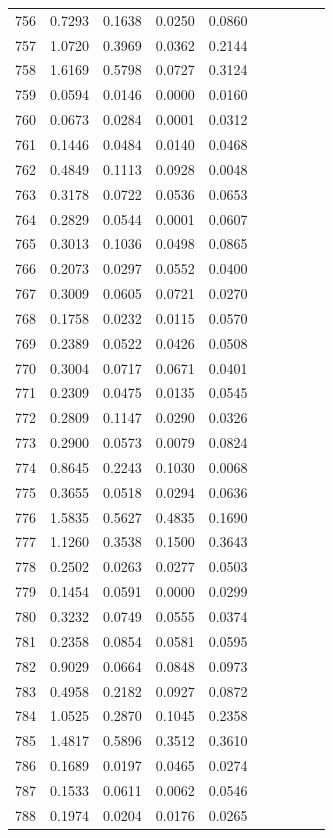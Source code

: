 \begin{table}
\begin{tabular}{cccccccccc}
756& 0.7293& 0.1638& 0.0250& 0.0860\\ 
757& 1.0720& 0.3969& 0.0362& 0.2144\\ 
758& 1.6169& 0.5798& 0.0727& 0.3124\\ 
759& 0.0594& 0.0146& 0.0000& 0.0160\\ 
760& 0.0673& 0.0284& 0.0001& 0.0312\\ 
761& 0.1446& 0.0484& 0.0140& 0.0468\\ 
762& 0.4849& 0.1113& 0.0928& 0.0048\\ 
763& 0.3178& 0.0722& 0.0536& 0.0653\\ 
764& 0.2829& 0.0544& 0.0001& 0.0607\\ 
765& 0.3013& 0.1036& 0.0498& 0.0865\\ 
766& 0.2073& 0.0297& 0.0552& 0.0400\\ 
767& 0.3009& 0.0605& 0.0721& 0.0270\\ 
768& 0.1758& 0.0232& 0.0115& 0.0570\\ 
769& 0.2389& 0.0522& 0.0426& 0.0508\\ 
770& 0.3004& 0.0717& 0.0671& 0.0401\\ 
771& 0.2309& 0.0475& 0.0135& 0.0545\\ 
772& 0.2809& 0.1147& 0.0290& 0.0326\\ 
773& 0.2900& 0.0573& 0.0079& 0.0824\\ 
774& 0.8645& 0.2243& 0.1030& 0.0068\\ 
775& 0.3655& 0.0518& 0.0294& 0.0636\\ 
776& 1.5835& 0.5627& 0.4835& 0.1690\\ 
777& 1.1260& 0.3538& 0.1500& 0.3643\\ 
778& 0.2502& 0.0263& 0.0277& 0.0503\\ 
779& 0.1454& 0.0591& 0.0000& 0.0299\\ 
780& 0.3232& 0.0749& 0.0555& 0.0374\\ 
781& 0.2358& 0.0854& 0.0581& 0.0595\\ 
782& 0.9029& 0.0664& 0.0848& 0.0973\\ 
783& 0.4958& 0.2182& 0.0927& 0.0872\\ 
784& 1.0525& 0.2870& 0.1045& 0.2358\\ 
785& 1.4817& 0.5896& 0.3512& 0.3610\\ 
786& 0.1689& 0.0197& 0.0465& 0.0274\\ 
787& 0.1533& 0.0611& 0.0062& 0.0546\\ 
788& 0.1974& 0.0204& 0.0176& 0.0265\\ 

\end{tabular}
\end{table}
